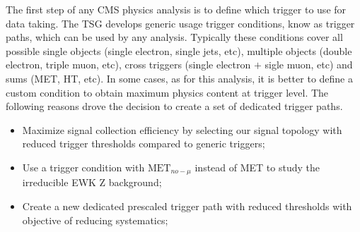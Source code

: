 % 
%
%
%
%




The first step of any \gls{CMS} physics analysis is to define which trigger to use for data taking. The \gls{TSG} develops generic usage trigger conditions, know as trigger paths, which can be used by any analysis. Typically these conditions cover all possible single objects (single electron, single jets, etc), multiple objects (double electron, triple muon, etc), cross triggers (single electron $+$ sigle muon, etc) and sums (\gls{MET}, \gls{HT}, etc). In some cases, as for this analysis, it is better to define a custom condition to obtain maximum physics content at trigger level. The following reasons drove the decision to create a set of dedicated trigger paths.

\begin{itemize}
  \item Maximize signal collection efficiency by selecting our signal topology with reduced trigger thresholds compared to generic triggers;
  \item Use a trigger condition with $\text{MET}_{no-\mu}$ instead of MET to study the irreducible \gls{EWK} Z background;
  \item Create a new dedicated prescaled trigger path with reduced thresholds with objective of reducing systematics;
\end{itemize}


